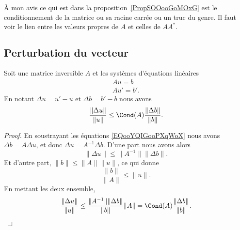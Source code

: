 \begin{probleme}
	À mon avis ce qui est dans la proposition~\ref{PropSOOooGoMOxG} est le conditionnement de la matrice ou sa racine carrée ou un truc du genre. Il faut voir le lien entre les valeurs propres de \( A\) et celles de \( AA^*\).
\end{probleme}

\subsection{Perturbation du vecteur}

\begin{proposition}        \label{PROPooGIXFooAhJkIs}
	Soit une matrice inversible \( A\) et les systèmes d'équations linéaires
	\begin{subequations}        \label{EQooYQIGooPXqWoX}
		\begin{align}
			Au=b \\
			Au'=b'.
		\end{align}
	\end{subequations}
	En notant \( \Delta u=u'-u\) et \( \Delta b=b'-b\) nous avons
	\begin{equation}        \label{EQooESXRooMYuvRa}
		\frac{ \| \Delta u \| }{ \| u \| }\leq \Cond(A)\frac{ \| \Delta b \| }{ \| b \| }.
	\end{equation}
\end{proposition}

\begin{proof}
	En soustrayant les équations \eqref{EQooYQIGooPXqWoX} nous avons \( \Delta b=A\Delta u\), et donc \( \Delta u=A^{-1} \Delta b\). D'une part nous avons alors
	\begin{equation}
		\| \Delta u \|\leq \| A^{-1} \|\| \Delta b \|.
	\end{equation}
	Et d'autre part, \( \| b \|\leq \| A \|\| u \|\), ce qui donne
	\begin{equation}
		\frac{ \| b \| }{ \| A \| }\leq \| u \|.
	\end{equation}
	En mettant les deux ensemble,
	\begin{equation}
		\frac{ \| \Delta u \| }{ \| u \| }\leq \frac{ \| A^{-1} \|\| \Delta b \| }{ \| b \| }\| A \|=\Cond(A)\frac{ \| \Delta b \| }{ \| b \| }.
	\end{equation}
\end{proof}

